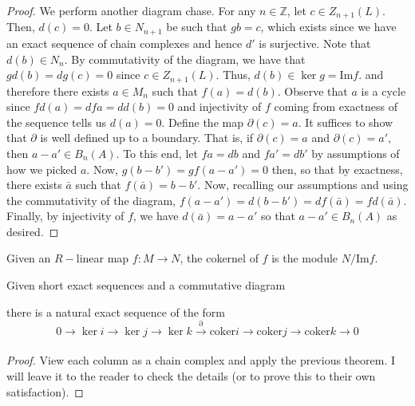 \documentclass[12pt,reqno]{amsart}
\numberwithin{theorem}{section}
\theoremstyle{definition}
\theoremstyle{remark}
\numberwithin{equation}{section}
\newcommand{\Z}{\mathbb Z}
\renewcommand{\Im}{\text{Im}}
\newcommand{\del}{\partial}
\theoremstyle{definition}
\newcommand{\coker}{\mathrm{coker}}
\begin{document}
\begin{proof}
    We perform another diagram chase. For any $n \in \Z$, let $c \in Z_{n+1}(L)$. Then, $d(c) = 0$. Let $b \in N_{n+1}$ be such that $gb= c$, which exists since we have an exact sequence of chain complexes and hence $d'$ is surjective. Note that $d(b) \in N_n$. By commutativity of the diagram, we have that $gd(b)=dg(c)=0$ since $c \in Z_{n+1}(L)$. Thus, $d(b) \in \ker g = \Im f$.   and therefore there exists $a \in M_n$ such that $f(a) = d(b)$. Observe that $a$ is a cycle since $fd(a) = dfa = dd(b) = 0$ and injectivity of $f$ coming from exactness of the sequence tells us $d(a) = 0$. Define the map $\del (c) = a$. It suffices to show that $\del$ is well defined up to a boundary. That is, if $\del (c) = a$ and $\del (c) = a'$, then $a-a' \in B_n(A)$. To this end, let $fa= db$ and $fa'=db'$ by assumptions of how we picked $a$. Now, $g(b-b') = gf(a-a')= 0$ then, so that by exactness, there exists $\bar a $ such that $f(\bar a ) = b-b' $. Now, recalling our assumptions and using the commutativity of the diagram, $f(a-a')=d(b-b')=df(\bar a) = fd(\bar a) $. Finally, by injectivity of $f$, we have $d(\bar a) = a-a'$ so that $a-a' \in B_n(A)$ as desired.
\end{proof} 
\begin{definition}
    Given an $R-$linear map $f:M\rightarrow N$, the cokernel of $f$ is the module $N /\Im f$.
\end{definition}
\begin{corollary}
    Given short exact sequences and a commutative diagram 
    \begin{center}
    \end{center}
    there is a natural exact sequence of the form
    $$0 \rightarrow \ker i \rightarrow \ker j \rightarrow \ker k \xrightarrow[]{\del} \coker i \rightarrow \coker j \rightarrow \coker k \rightarrow 0 $$
\end{corollary}
\begin{proof}
    View each column as a chain complex and apply the previous theorem. I will leave it to the reader to check the details (or to prove this to their own satisfaction).
\end{proof}
\end{document}
